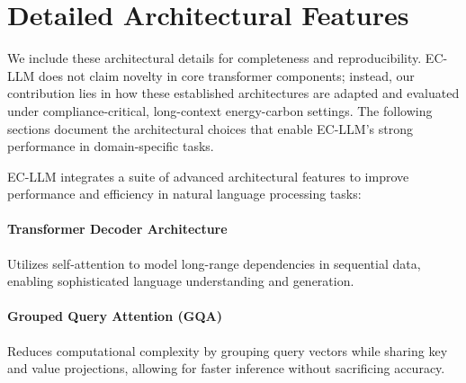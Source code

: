 \documentclass[]{interact}
\theoremstyle{plain}%
\theoremstyle{definition}
\theoremstyle{remark}
\begin{document}
\appendix

\section{Detailed Architectural Features}\label{secA1}

We include these architectural details for completeness and reproducibility. EC-LLM does not claim novelty in core transformer components; instead, our contribution lies in how these established architectures are adapted and evaluated under compliance-critical, long-context energy-carbon settings. The following sections document the architectural choices that enable EC-LLM's strong performance in domain-specific tasks.

EC-LLM integrates a suite of advanced architectural features to improve performance and efficiency in natural language processing tasks:

\paragraph{Transformer Decoder Architecture} Utilizes self-attention to model long-range dependencies in sequential data, enabling sophisticated language understanding and generation.

\paragraph{Grouped Query Attention (GQA)} Reduces computational complexity by grouping query vectors while sharing key and value projections, allowing for faster inference without sacrificing accuracy.
\end{document}
